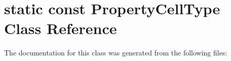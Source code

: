 \hypertarget{classstatic_01const_01PropertyCellType}{}\section{static const Property\+Cell\+Type Class Reference}
\label{classstatic_01const_01PropertyCellType}


The documentation for this class was generated from the following files\+: